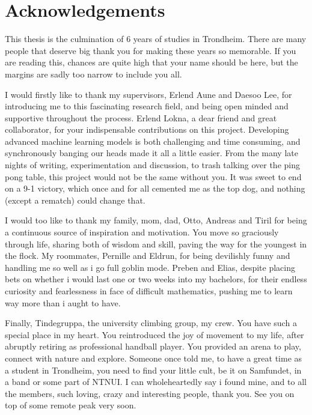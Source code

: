 \documentclass[../../thesis.tex]{subfiles}
\begin{document}

\section{Acknowledgements}
This thesis is the culmination of 6 years of studies in Trondheim. There are many people that deserve big thank you for making these years so memorable. If you are reading this, chances are quite high that your name should be here, but the margins are sadly too narrow to include you all.\newline 

I would firstly like to thank my supervisors, Erlend Aune and Daesoo Lee, for introducing me to this fascinating research field, and being open minded and supportive throughout the process. Erlend Lokna, a dear friend and great collaborator, for your indispensable contributions on this project. Developing advanced machine learning models is both challenging and time consuming, and synchronously banging our heads made it all a little easier. From the many late nights of writing, experimentation and discussion, to trash talking over the ping pong table, this project would not be the same without you. It was sweet to end on a 9-1 victory, which once and for all cemented me as the top dog, and nothing (except a rematch) could change that.\newline

I would too like to thank my family, mom, dad, Otto, Andreas and Tiril for being a continuous source of inspiration and motivation. You move so graciously through life, sharing both of wisdom and skill, paving the way for the youngest in the flock. My roommates, Pernille and Eldrun, for being devilishly funny and handling me so well as i go full goblin mode. Preben and Elias, despite placing bets on whether i would last one or two weeks into my bachelors, for their endless curiosity and fearlessness in face of difficult mathematics, pushing me to learn way more than i aught to have. \newline

Finally, Tindegruppa, the university climbing group, my crew. You have such a special place in my heart. You reintroduced the joy of movement to my life, after abruptly retiring as professional handball player. You provided an arena to play, connect with nature and explore. Someone once told me, to have a great time as a student in Trondheim, you need to find your little cult, be it on Samfundet, in a band or some part of NTNUI. I can wholeheartedly say i found mine, and to all the members, such loving, crazy and interesting people, thank you. See you on top of some remote peak very soon.
\end{document}
